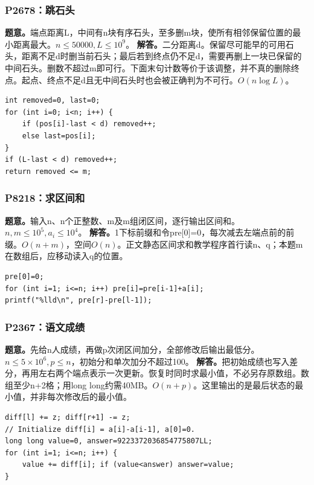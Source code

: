 \subsubsection{P2678：跳石头}
\textbf{题意。}端点距离L，中间有n块有序石头，至多删m块，使所有相邻保留位置的最小距离最大。$n\le50000,L\le10^9$。
\textbf{解答。}二分距离d。保留尽可能早的可用石头，距离不足d时删当前石头；最后若到终点仍不足d，需要再删上一块已保留的中间石头。删数不超过m即可行。下面末句计数等价于该调整，并不真的删除终点。起点、终点不足d且无中间石头时也会被正确判为不可行。$O(n\log L)$。
\begin{lstlisting}
int removed=0, last=0;
for (int i=0; i<n; i++) {
    if (pos[i]-last < d) removed++;
    else last=pos[i];
}
if (L-last < d) removed++;
return removed <= m;
\end{lstlisting}

\subsubsection{P8218：求区间和}
\textbf{题意。}输入n、n个正整数、m及m组闭区间，逐行输出区间和。$n,m\le10^5,a_i\le10^4$。
\textbf{解答。}1下标前缀和令pre[0]=0，每次减去左端点前的前缀。$O(n+m)$，空间$O(n)$。正文静态区间求和教学程序首行读n、q；本题m在数组后，应移动读入q的位置。
\begin{lstlisting}
pre[0]=0;
for (int i=1; i<=n; i++) pre[i]=pre[i-1]+a[i];
printf("%lld\n", pre[r]-pre[l-1]);
\end{lstlisting}

\subsubsection{P2367：语文成绩}
\textbf{题意。}先给n人成绩，再做p次闭区间加分，全部修改后输出最低分。$n\le5\times10^6,p\le n$，初始分和单次加分不超过100。
\textbf{解答。}把初始成绩也写入差分，再用左右两个端点表示一次更新。恢复时同时求最小值，不必另存原数组。数组至少n+2格；用long long约需40MB。$O(n+p)$。这里输出的是最后状态的最小值，并非每次修改后的最小值。
\begin{lstlisting}
diff[l] += z; diff[r+1] -= z;
// Initialize diff[i] = a[i]-a[i-1], a[0]=0.
long long value=0, answer=9223372036854775807LL;
for (int i=1; i<=n; i++) {
    value += diff[i]; if (value<answer) answer=value;
}
\end{lstlisting}

